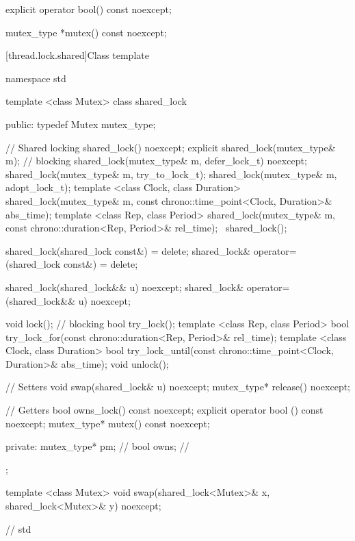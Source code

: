 \begin{itemdescr}
\pnum\returns {}
\end{itemdescr}

%
%
\begin{itemdecl}
explicit operator bool() const noexcept;
\end{itemdecl}

\begin{itemdescr}
\pnum\returns {}
\end{itemdescr}

%
%
\begin{itemdecl}
mutex_type *mutex() const noexcept;
\end{itemdecl}

\begin{itemdescr}
\pnum\returns {}
\end{itemdescr}

[thread.lock.shared]{Class template }

\begin{codeblock}
namespace std {

template <class Mutex>
class shared_lock {
public:
  typedef Mutex mutex_type;

  // Shared locking
  shared_lock() noexcept;
  explicit shared_lock(mutex_type& m);  // blocking
  shared_lock(mutex_type& m, defer_lock_t) noexcept;
  shared_lock(mutex_type& m, try_to_lock_t);
  shared_lock(mutex_type& m, adopt_lock_t);
  template <class Clock, class Duration>
    shared_lock(mutex_type& m,
                const chrono::time_point<Clock, Duration>& abs_time);
  template <class Rep, class Period>
    shared_lock(mutex_type& m,
                const chrono::duration<Rep, Period>& rel_time);
  ~shared_lock();

  shared_lock(shared_lock const&) = delete;
  shared_lock& operator=(shared_lock const&) = delete;

  shared_lock(shared_lock&& u) noexcept;
  shared_lock& operator=(shared_lock&& u) noexcept;

  void lock();  // blocking
  bool try_lock();
  template <class Rep, class Period>
    bool try_lock_for(const chrono::duration<Rep, Period>& rel_time);
  template <class Clock, class Duration>
    bool try_lock_until(const chrono::time_point<Clock, Duration>& abs_time);
  void unlock();

  // Setters
  void swap(shared_lock& u) noexcept;
  mutex_type* release() noexcept;

  // Getters
  bool owns_lock() const noexcept;
  explicit operator bool () const noexcept;
  mutex_type* mutex() const noexcept;

private:
  mutex_type* pm; // \expos
  bool owns;      // \expos
};

template <class Mutex>
  void swap(shared_lock<Mutex>& x, shared_lock<Mutex>& y) noexcept;

}  // std
\end{codeblock}

